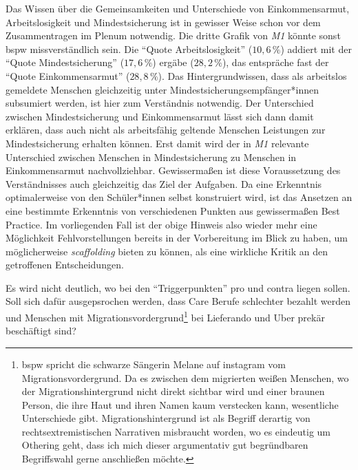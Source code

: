 Das Wissen über die Gemeinsamkeiten und Unterschiede von Einkommensarmut, Arbeitslosigkeit und Mindestsicherung ist in gewisser Weise schon vor dem Zusammentragen im Plenum notwendig. 
Die dritte Grafik von \emph{M1} könnte sonst \gls{bspw} missverständlich sein. Die \enquote{Quote Arbeitslosigkeit} ($10,6\,\%$) addiert mit der \enquote{Quote Mindestsicherung} ($17,6\,\%$) ergäbe ($28,2\,\%$), das entspräche fast der \enquote{Quote Einkommensarmut} ($28,8\,\%$). Das Hintergrundwissen, dass als arbeitslos gemeldete Menschen gleichzeitig unter Mindestsicherungsempfänger*innen subsumiert werden, ist hier zum Verständnis notwendig. Der Unterschied zwischen Mindestsicherung und Einkommensarmut lässt sich dann damit erklären, dass auch nicht als arbeitsfähig geltende Menschen Leistungen zur Mindestsicherung erhalten können. Erst damit wird der in \emph{M1} relevante Unterschied zwischen Menschen in Mindestsicherung zu Menschen in Einkommensarmut nachvollziehbar. Gewissermaßen ist diese Voraussetzung des Verständnisses auch gleichzeitig das Ziel der Aufgaben. Da eine Erkenntnis optimalerweise von den Schüler*innen selbst konstruiert wird, ist das Ansetzen an eine bestimmte Erkenntnis von verschiedenen Punkten aus gewissermaßen Best Practice. Im vorliegenden Fall ist der obige Hinweis also wieder mehr eine Möglichkeit Fehlvorstellungen bereits in der Vorbereitung im Blick zu haben, um möglicherweise \emph{scaffolding} bieten zu können, als eine wirkliche Kritik an den getroffenen Entscheidungen. 

Es wird nicht deutlich, wo bei den \enquote{Triggerpunkten} pro und contra liegen sollen. Soll sich dafür ausgepsrochen werden, dass Care Berufe schlechter bezahlt werden und Menschen mit Migrationsvordergrund\footnote{
    \Gls{bspw} spricht die schwarze Sängerin Melane auf instagram vom Migrationsvordergrund. Da es zwischen dem migrierten weißen Menschen, wo der Migrationshintergrund nicht direkt sichtbar wird und einer braunen Person, die ihre Haut und ihren Namen kaum verstecken kann, wesentliche Unterschiede gibt. Migrationshintergrund ist als Begriff derartig von rechtsextremistischen Narrativen misbraucht worden, wo es eindeutig um Othering geht, dass ich mich dieser argumentativ gut begründbaren Begriffswahl gerne anschließen möchte.  
} bei Lieferando und Uber prekär beschäftigt sind? 

